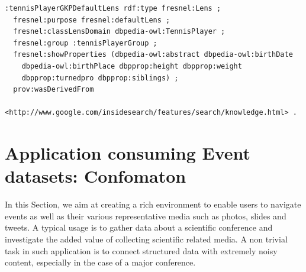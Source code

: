 \begin{lstlisting}
:tennisPlayerGKPDefaultLens rdf:type fresnel:Lens ;
  fresnel:purpose fresnel:defaultLens ;
  fresnel:classLensDomain dbpedia-owl:TennisPlayer ;
  fresnel:group :tennisPlayerGroup ;
  fresnel:showProperties (dbpedia-owl:abstract dbpedia-owl:birthDate
    dbpedia-owl:birthPlace dbpprop:height dbpprop:weight
    dbpprop:turnedpro dbpprop:siblings) ;
  prov:wasDerivedFrom
    <http://www.google.com/insidesearch/features/search/knowledge.html> .	
\end{lstlisting}
\normalsize

\section{Application consuming Event datasets: Confomaton}
\label{sec:confomaton}

In this Section, we aim at creating a rich environment to enable users to navigate events as well as their various representative media such as photos, slides and tweets. A typical usage is to gather data about a scientific conference and investigate the added value of collecting scientific related media. A non trivial task in such application is to connect structured data with extremely noisy content, especially in the case of a major conference.

